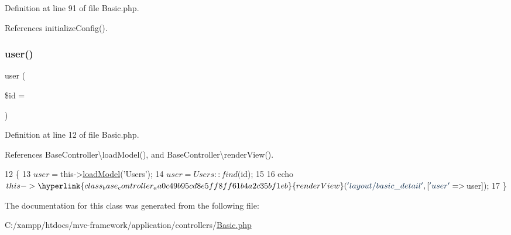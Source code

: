 Definition at line 91 of file Basic.\+php.



References initialize\+Config().


\hypertarget{class_basic_a6603546e99f9519b86989be128736ad6}{}\label{class_basic_a6603546e99f9519b86989be128736ad6} 
\subsubsection{\texorpdfstring{user()}{user()}}
{\footnotesize\ttfamily user (\begin{DoxyParamCaption}\item[{}]{\$id = {\ttfamily \textquotesingle{}\textquotesingle{}} }\end{DoxyParamCaption})}



Definition at line 12 of file Basic.\+php.



References Base\+Controller\textbackslash{}load\+Model(), and Base\+Controller\textbackslash{}render\+View().


\begin{DoxyCode}
12                                    \{
13         $user = $this->\hyperlink{class_base_controller_a5fa8890bd3a9d20f5c0cc2377dc49eb1}{loadModel}(\textcolor{stringliteral}{'Users'});
14         $user = Users::find($id);
15 
16         echo $this->\hyperlink{class_base_controller_aa0c49b95cd8e5ff8ff61b4a2c35bf1eb}{renderView}(\textcolor{stringliteral}{'layout/basic\_detail'}, [\textcolor{stringliteral}{'user'} => $user]);
17     \}
\end{DoxyCode}


The documentation for this class was generated from the following file\+:\begin{DoxyCompactItemize}
\item 
C\+:/xampp/htdocs/mvc-\/framework/application/controllers/\hyperlink{controllers_2_basic_8php}{Basic.\+php}\end{DoxyCompactItemize}
